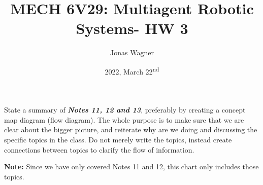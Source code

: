 \documentclass[]{article}
\title{MECH 6V29: Multiagent Robotic Systems- HW 3}
\author{Jonas Wagner}
\date{2022, March 22\textsuperscript{nd}}
\numberwithin{equation}{section}
\begin{document}
	

\maketitle

\tableofcontents


\newpage
\section{}
State a summary of \emph{\textbf{Notes 11, 12 and 13}}, preferably by creating a concept map diagram (flow diagram). 
The whole purpose is to make sure that we are clear about the bigger picture, 
and reiterate why are we doing and discussing the specific topics in the class. 
Do not merely write the topics, instead create connections between topics to clarify the flow of information.

\textbf{Note:} 
Since we have only covered Notes 11 and 12, this chart only includes those topics.
\end{document}
